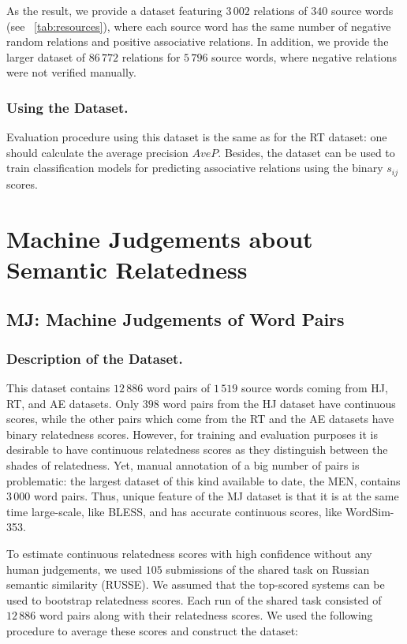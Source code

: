 \documentclass[runningheads,a4paper]{llncs}
\begin{document}
As the result, we provide a dataset featuring $3\,002$ relations of $340$ source words (see \tablename~\ref{tab:resources}), where  each source word has the same number of negative random relations and positive associative relations. In addition, we provide the larger dataset of $86\,772$ relations for $5\,796$ source words, where negative relations were not verified manually.

\subsubsection{Using the Dataset.}  Evaluation procedure using this dataset is the same as for the RT dataset: one should calculate the average precision $AveP$. Besides, the dataset can be used to train classification models for predicting associative relations using the binary $s_{ij}$ scores.

\section{Machine Judgements about Semantic Relatedness}\label{sec:machine}

\subsection{MJ: Machine Judgements of Word Pairs }\label{sub:mj}

\subsubsection{Description of the Dataset.}

This dataset contains $12\,886$ word pairs of $1\,519$ source words coming from HJ, RT, and AE datasets. Only $398$ word pairs from the HJ dataset have continuous scores, while the other pairs which come from the RT and the AE datasets have binary relatedness scores. However, for training and evaluation purposes it is desirable to have continuous relatedness scores as they distinguish between the shades of relatedness. Yet, manual annotation of a big number of pairs is problematic: the largest dataset of this kind available to date, the MEN, contains $3\,000$ word pairs. Thus, unique feature of the MJ dataset is that it is at the same time large-scale, like BLESS, and has accurate continuous scores, like WordSim-353. 

To estimate continuous relatedness scores with high confidence without any human judgements, we used $105$ submissions of the shared task on Russian semantic similarity (RUSSE). We assumed that the top-scored systems can be used to bootstrap relatedness scores. Each run of the shared task consisted of $12\,886$ word pairs along with their relatedness scores. We used the following procedure to average these scores and construct the dataset:
\end{document}

